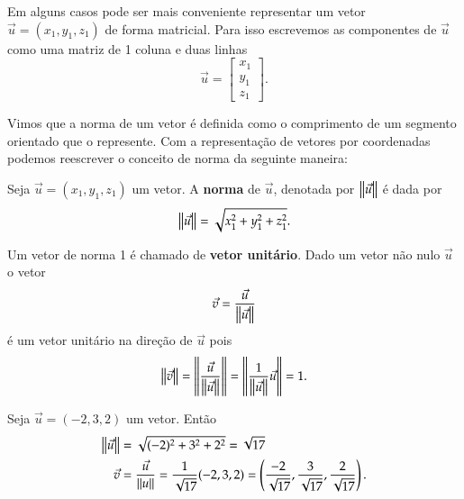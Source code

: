 Em alguns casos pode ser mais conveniente representar um vetor $\vec{u} = (x_1, y_1,z_1)$ de forma matricial. Para isso escrevemos as componentes de $\vec{u}$ como uma matriz de 1 coluna e duas linhas
\[
  \vec{u} = \begin{bmatrix}
    x_1\\y_1\\z_1
  \end{bmatrix}.
\]

Vimos que a norma de um vetor \'e definida como o comprimento de um segmento orientado que o represente. Com a representa\c{c}\~ao de vetores por coordenadas podemos reescrever o conceito de norma da seguinte maneira:
\begin{definicao}
  Seja $\vec{u} = (x_1, y_1,z_1)$ um vetor. A \textbf{norma} de $\vec{u}$, denotada por $\left\Vert{\vec{u}}\right\Vert$ \'e dada por
  \[
    \left\Vert{\vec{u}}\right\Vert = \sqrt{x_1^2 + y_1^2 + z_1^2}.
  \]
\end{definicao}

Um vetor de norma 1 \'e chamado de \textbf{vetor unit\'ario}. Dado um vetor n\~ao nulo $\vec{u}$ o vetor
\[
  \vec{v} = \dfrac{\vec{u}}{\left\Vert{\vec{u}}\right\Vert}
\]
\'e um vetor unit\'ario na dire\c{c}\~ao de $\vec{u}$ pois
\[
  \left\Vert{\vec{v}}\right\Vert = \left\Vert{\dfrac{\vec{u}}{\left\Vert{\vec{u}}\right\Vert}}\right\Vert = \left\Vert{\dfrac{1}{\left\Vert{\vec{u}}\right\Vert}\vec{u}}\right\Vert = 1.
\]

\begin{exemplo}
  Seja $\vec{u} = (-2,3,2)$ um vetor. Ent\~ao
  \begin{align*}
    \left\Vert{\vec{u}}\right\Vert &= \sqrt{(-2)^2 + 3^2 + 2^2} = \sqrt{17}\\
    \vec{v} &= \dfrac{\vec{u}}{\left\Vert{u}\right\Vert} = \dfrac{1}{\sqrt{17}}(-2,3,2) = \left(\dfrac{-2}{\sqrt{17}}, \dfrac{3}{\sqrt{17}}, \dfrac{2}{\sqrt{17}}\right).
  \end{align*}
\end{exemplo}

